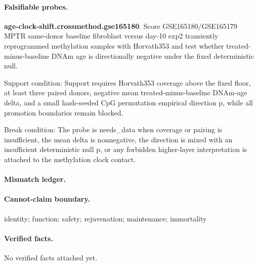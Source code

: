 \paragraph{Falsifiable probes.}
\textbf{age-clock-shift.crossmethod.gse165180}. Score GSE165180/GSE165179 MPTR same-donor baseline fibroblast versus day-10 exp2 transiently reprogrammed methylation samples with Horvath353 and test whether treated-minus-baseline DNAm age is directionally negative under the fixed deterministic null.

Support condition: Support requires Horvath353 coverage above the fixed floor, at least three paired donors, negative mean treated-minus-baseline DNAm-age delta, and a small hash-seeded CpG permutation empirical direction p, while all promotion boundaries remain blocked.

Break condition: The probe is needs\_data when coverage or pairing is insufficient, the mean delta is nonnegative, the direction is mixed with an insufficient deterministic null p, or any forbidden higher-layer interpretation is attached to the methylation clock contact.

\paragraph{Mismatch ledger.}
\paragraph{Cannot-claim boundary.} identity; function; safety; rejuvenation; maintenance; immortality

\paragraph{Verified facts.}
No verified facts attached yet.
